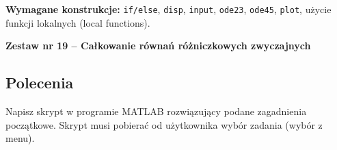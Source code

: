 \documentclass[a4paper,11pt]{article}
\begin{document}
\vspace{0.3cm}
\begin{ramka}
\textbf{Wymagane konstrukcje:}
\texttt{if/else}, \texttt{disp}, \texttt{input}, \texttt{ode23}, \texttt{ode45}, \texttt{plot}, użycie funkcji lokalnych (local functions).
\end{ramka}

\clearpage
\begin{center}
  {\large\bfseries Zestaw nr 19 \quad -- \quad Całkowanie równań różniczkowych zwyczajnych}
\end{center}
\hrulefill
\vspace{0.4cm}

\subsection*{Polecenia}

Napisz skrypt w programie MATLAB rozwiązujący podane zagadnienia początkowe. Skrypt musi pobierać od użytkownika wybór zadania (wybór z menu).
\end{document}
